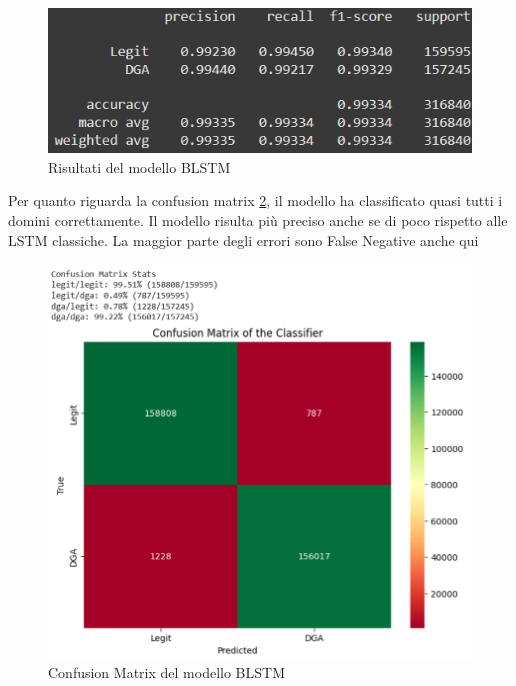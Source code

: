 \documentclass[12pt,a4paper,openright,twoside]{book}
\begin{document}
\begin{figure}[H]
    \centering
    \includegraphics[width=.8\linewidth]{figures/BLSTM_results.png}
    \caption{Risultati del modello BLSTM}
    \label{fig:BLSTM results}
\end{figure}

\noindent Per quanto riguarda la confusion matrix \ref{fig:BLSTM confusion matrix}, il modello ha classificato
quasi tutti i domini correttamente. Il modello risulta più preciso anche se di poco rispetto alle LSTM classiche.
La maggior parte degli errori sono False Negative anche qui
\begin{figure}[H]
    \centering
    \includegraphics[width=.8\linewidth]{figures/BLSTM conf_matr.png}
    \caption{Confusion Matrix del modello BLSTM}
    \label{fig:BLSTM confusion matrix}
\end{figure}





\end{document}
